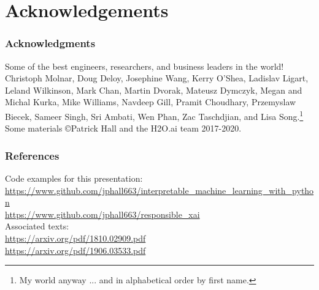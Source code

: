 \documentclass[11pt,aspectratio=169,hyperref={colorlinks}]{beamer}
\begin{document}
		
\section{Acknowledgements} 

	\begin{frame}
	
		\frametitle{Acknowledgments}
		
		Some of the best engineers, researchers, and business leaders in the world!\\
		\vspace{10pt}
		Christoph Molnar, Doug Deloy, Josephine Wang, Kerry O'Shea, Ladislav Ligart, Leland Wilkinson, Mark Chan, Martin Dvorak, Mateusz Dymczyk, Megan and Michal Kurka, Mike Williams, Navdeep Gill, Pramit Choudhary, Przemyslaw Biecek, Sameer Singh, Sri Ambati, Wen Phan, Zac Taschdjian, and Lisa Song.\footnote{\tiny{My world anyway ... and in alphabetical order by first name.}}\\
		\vspace{10pt}
		Some materials \copyright\hspace{1pt}Patrick Hall and the H2O.ai team 2017-2020. 

	\end{frame}	
			


	\begin{frame}[t, allowframebreaks]
	
		\frametitle{References}	
		
			\normalsize Code examples for this presentation:\\
			\scriptsize{\url{https://www.github.com/jphall663/interpretable_machine_learning_with_python}}\\
			\noindent\scriptsize{\url{https://www.github.com/jphall663/responsible_xai}}\\
			\vspace{10pt}
			\normalsize Associated texts:\\
			\scriptsize{\url{https://arxiv.org/pdf/1810.02909.pdf}}\\
			\noindent\scriptsize{\url{https://arxiv.org/pdf/1906.03533.pdf}}
								
		\framebreak		
		
		\tiny
		\printbibliography
		
	\end{frame}
\end{document}
